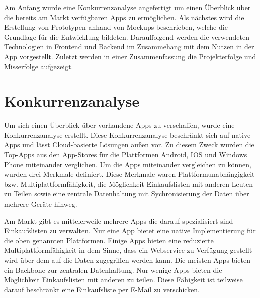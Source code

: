 \documentclass[10pt, conference, compsocconf]{IEEEtran}
\begin{document}
Am Anfang wurde eine Konkurrenzanalyse angefertigt um einen \"Uberblick \"uber die bereits am Markt verf\"ugbaren Apps zu erm\"oglichen.
Als n\"achstes wird die Erstellung von Prototypen anhand von Mockups beschrieben, welche die Grundlage f\"ur die Entwicklung bildeten.
Darauffolgend werden die verwendeten Technologien in Frontend und Backend im Zusammehang mit dem Nutzen in der App vorgestellt. Zuletzt werden in einer Zusammenfassung die Projekterfolge und Misserfolge aufgezeigt.

\section{Konkurrenzanalyse}
Um sich einen \"Uberblick \"uber vorhandene Apps zu verschaffen, wurde eine Konkurrenzanalyse erstellt.
Diese Konkurrenzanalyse beschr\"ankt sich auf native Apps und l\"asst Cloud-basierte L\"osungen au{\ss}en vor.
Zu diesem Zweck wurden die Top-Apps aus den App-Stores f\"ur die Plattformen Android, IOS und Windows Phone miteinander verglichen.
Um die Apps miteinander vergleichen zu k\"onnen, wurden drei Merkmale definiert. 
Diese Merkmale waren Plattformunabh\"angigkeit bzw. Multiplattformf\"ahigkeit, 
die M\"oglichkeit Einkaufslisten mit anderen Leuten zu Teilen sowie eine zentrale Datenhaltung mit Sychronisierung der Daten \"uber mehrere Ger\"ate hinweg.

Am Markt gibt es mittelerweile mehrere Apps die darauf spezialisiert sind Einkaufslisten zu verwalten.
Nur eine App bietet eine native Implementierung f\"ur die oben genannten Plattformen. Einige Apps bieten eine reduzierte Multiplattformf\"ahigkeit in dem Sinne, dass ein Webservice zu Verf\"ugung gestellt wird \"uber dem auf die Daten zugegriffen werden kann.
Die meisten Apps bieten ein Backbone zur zentralen Datenhaltung.
Nur wenige Apps bieten die M\"oglichkeit Einkaufslisten mit anderen zu teilen. Diese F\"ahigkeit ist teilweise darauf beschr\"ankt eine Einkaufsliste per E-Mail zu 
verschicken.
\end{document}
